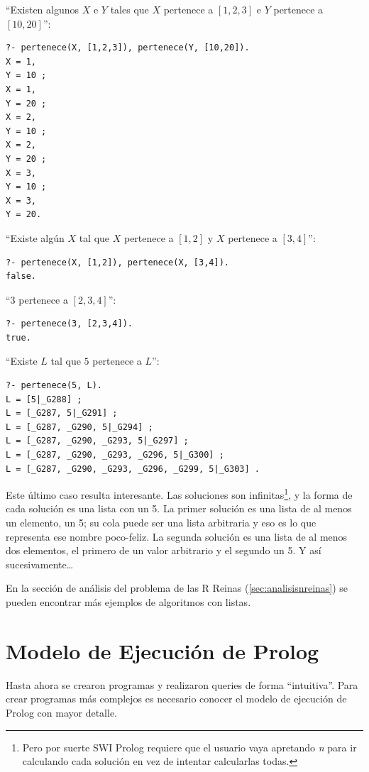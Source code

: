 \documentclass[12pt,titlepage]{article}
\begin{document}
``Existen algunos $X$ e $Y$ tales que $X$ pertenece a $[1,2,3]$ e $Y$ pertenece a $[10,20]$'':
\begin{lstlisting}
?- pertenece(X, [1,2,3]), pertenece(Y, [10,20]).
X = 1,
Y = 10 ;
X = 1,
Y = 20 ;
X = 2,
Y = 10 ;
X = 2,
Y = 20 ;
X = 3,
Y = 10 ;
X = 3,
Y = 20.
\end{lstlisting}

``Existe algún $X$ tal que $X$ pertenece a $[1, 2]$ y $X$ pertenece a $[3, 4]$'':
\begin{lstlisting}
?- pertenece(X, [1,2]), pertenece(X, [3,4]).
false.

\end{lstlisting}

``$3$ pertenece a $[2,3,4]$'':
\begin{lstlisting}
?- pertenece(3, [2,3,4]).
true.
\end{lstlisting}

``Existe $L$ tal que $5$ pertenece a $L$'':
\begin{lstlisting}
?- pertenece(5, L).
L = [5|_G288] ;
L = [_G287, 5|_G291] ;
L = [_G287, _G290, 5|_G294] ;
L = [_G287, _G290, _G293, 5|_G297] ;
L = [_G287, _G290, _G293, _G296, 5|_G300] ;
L = [_G287, _G290, _G293, _G296, _G299, 5|_G303] .
\end{lstlisting}

Este último caso resulta interesante. Las soluciones son infinitas\footnote{Pero por suerte SWI Prolog requiere que el usuario vaya apretando \emph{n} para ir calculando cada solución en vez de intentar calcularlas todas.}, y la forma de cada solución es una lista con un 5. La primer solución es una lista de al menos un elemento, un 5; su cola puede ser una lista arbitraria y eso es lo que representa ese nombre poco-feliz. La segunda solución es una lista de al menos dos elementos, el primero de un valor arbitrario y el segundo un 5. Y así sucesivamente\dots

En la sección de análisis del problema de las R Reinas (\ref{sec:analisisnreinas}) se pueden encontrar más ejemplos de algoritmos con listas.

\newpage
\section{Modelo de Ejecución de Prolog}

Hasta ahora se crearon programas y realizaron queries de forma ``intuitiva''. Para crear programas más complejos es necesario conocer el modelo de ejecución de Prolog con mayor detalle.
\end{document}
